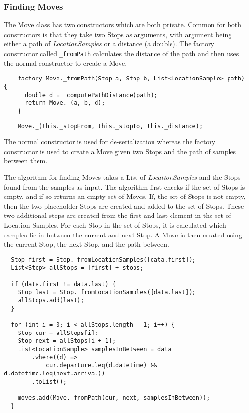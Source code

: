 \subsubsection*{Finding Moves}
The Move class has two constructors which are both private. Common for both constructors is that they take two Stops as arguments, with argument being either a path of \textit{LocationSamples} or a distance (a double). The factory constructor called \verb|_fromPath| calculates the distance of the path and then uses the normal constructor to create a Move. 
\begin{verbatim}
    factory Move._fromPath(Stop a, Stop b, List<LocationSample> path) {
      double d = _computePathDistance(path);
      return Move._(a, b, d);
    }
\end{verbatim}

\begin{verbatim}
    Move._(this._stopFrom, this._stopTo, this._distance);
\end{verbatim}
The normal constructor is used for de-serialization whereas the factory constructor is used to create a Move given two Stops and the path of samples between them.

The algorithm for finding Moves takes a List of \textit{LocationSamples} and the Stops found from the samples as input. The algorithm first checks if the set of Stops is empty, and if so returns an empty set of Moves. If, the set of Stops is not empty, then the two placeholder Stops are created and added to the set of Stops. These two additional stops are created from the first and last element in the set of Location Samples. For each Stop in the set of Stops, it is calculated which samples lie in between the current and next Stop. A Move is then created using the current Stop, the next Stop, and the path between. 

\begin{verbatim}
  Stop first = Stop._fromLocationSamples([data.first]);
  List<Stop> allStops = [first] + stops;

  if (data.first != data.last) {
    Stop last = Stop._fromLocationSamples([data.last]);
    allStops.add(last);
  }

  for (int i = 0; i < allStops.length - 1; i++) {
    Stop cur = allStops[i];
    Stop next = allStops[i + 1];
    List<LocationSample> samplesInBetween = data
        .where((d) =>
            cur.departure.leq(d.datetime) && d.datetime.leq(next.arrival))
        .toList();

    moves.add(Move._fromPath(cur, next, samplesInBetween));
  }
\end{verbatim}

